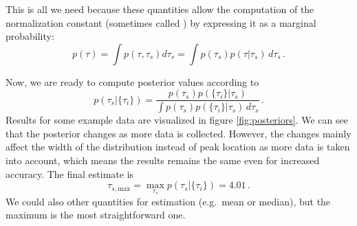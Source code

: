 \begin{ex}
This is all we need because these quantities allow the computation of the normalization constant (sometimes called ) by expressing it as a marginal probability\footnotemark:
\begin{equation*}
p(\tau) = \int p(\tau, \tau_s) d\tau_s = \int p(\tau_s) p(\tau | \tau_s) \, d\tau_s \, .
\end{equation*}


Now, we are ready to compute posterior values according to
\begin{equation*}
p(\tau_s | \{\tau_i\}) = \frac{p(\tau_s) p(\{\tau_i\} | \tau_s)}{\int p(\tau_s) p(\{\tau_i\} | \tau_s) \, d\tau_s} \, .
\end{equation*}
Results for some example data are visualized in figure \ref{fig:posteriors}. We can see that the posterior changes as more data is collected. However, the changes mainly affect the width of the distribution instead of peak location as more data is taken into account, which means the results remains the same even for increased accuracy. The final estimate is
\begin{equation*}
\tau_{s, \text{max}} = \max_{\tau_s} p(\tau_s | \{\tau_i\}) = 4.01 \, .
\end{equation*}
We could also other quantities for estimation (e.g.~mean or median), but the maximum is the most straightforward one.
\end{ex}

